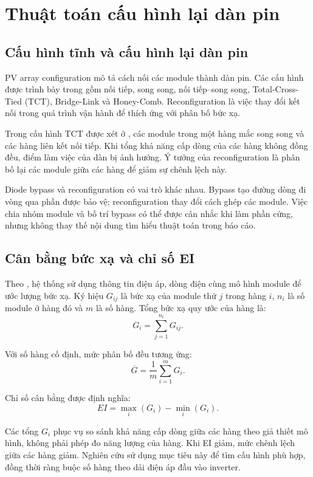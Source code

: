 \section{Thuật toán cấu hình lại dàn pin}
\label{sec:pv-configuration}

\subsection{Cấu hình tĩnh và cấu hình lại dàn pin}

PV array configuration mô tả cách nối các module thành dàn pin. Các cấu hình được trình bày trong \cite{thanh} gồm nối tiếp, song song, nối tiếp--song song, Total-Cross-Tied (TCT), Bridge-Link và Honey-Comb. Reconfiguration là việc thay đổi kết nối trong quá trình vận hành để thích ứng với phân bố bức xạ.

Trong cấu hình TCT được xét ở \cite{thanh}, các module trong một hàng mắc song song và các hàng liên kết nối tiếp. Khi tổng khả năng cấp dòng của các hàng không đồng đều, điểm làm việc của dàn bị ảnh hưởng. Ý tưởng của reconfiguration là phân bố lại các module giữa các hàng để giảm sự chênh lệch này.

Diode bypass và reconfiguration có vai trò khác nhau. Bypass tạo đường dòng đi vòng qua phần được bảo vệ; reconfiguration thay đổi cách ghép các module. Việc chia nhóm module và bố trí bypass có thể được cân nhắc khi làm phần cứng, nhưng không thay thế nội dung tìm hiểu thuật toán trong báo cáo.

\subsection{Cân bằng bức xạ và chỉ số EI}

Theo \cite{thanh}, hệ thống sử dụng thông tin điện áp, dòng điện cùng mô hình module để ước lượng bức xạ. Ký hiệu \(G_{ij}\) là bức xạ của module thứ \(j\) trong hàng \(i\), \(n_i\) là số module ở hàng đó và \(m\) là số hàng. Tổng bức xạ quy ước của hàng là:
\[
G_i=\sum_{j=1}^{n_i}G_{ij}.
\]

Với số hàng cố định, mức phân bố đều tương ứng:
\[
\overline{G}=\frac{1}{m}\sum_{i=1}^{m}G_i.
\]

Chỉ số cân bằng được định nghĩa:
\[
EI=\max_i(G_i)-\min_i(G_i).
\]

Các tổng \(G_i\) phục vụ so sánh khả năng cấp dòng giữa các hàng theo giả thiết mô hình, không phải phép đo năng lượng của hàng. Khi EI giảm, mức chênh lệch giữa các hàng giảm. Nghiên cứu \cite{thanh} sử dụng mục tiêu này để tìm cấu hình phù hợp, đồng thời ràng buộc số hàng theo dải điện áp đầu vào inverter.

